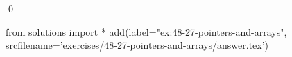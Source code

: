 
\begin{ex}
  \label{ex:48-27-pointers-and-arrays}
  
  \qed
\end{ex}
\begin{python0}
from solutions import *
add(label="ex:48-27-pointers-and-arrays",
    srcfilename='exercises/48-27-pointers-and-arrays/answer.tex')
\end{python0}
